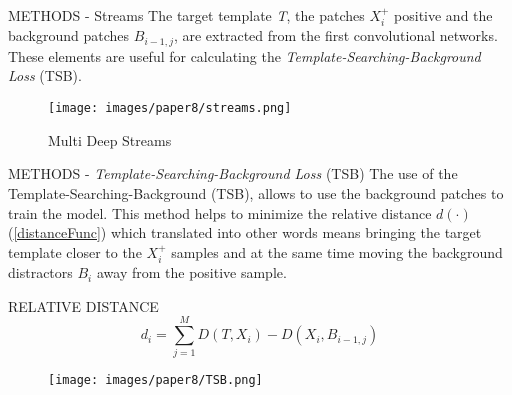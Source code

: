 \begin{frame}{METHODS - Streams}
    The target template \emph{T}, the patches $X_i^+$ positive and the background patches $B_{i-1,j}$, are extracted from the first convolutional networks. These elements are useful for calculating the \emph{Template-Searching-Background Loss} (TSB).
    \begin{figure}[h!]
        \centering
        \texttt{[image: images/paper8/streams.png]}
        \centering
        \caption{Multi Deep Streams}
        \label{fig:streams}
    \end{figure}
\end{frame}

\begin{frame}{METHODS - \emph{Template-Searching-Background Loss} (TSB)}
    The use of the Template-Searching-Background (TSB), allows to use the 
    background patches to train the model. This method helps to minimize 
    the relative distance $d(\cdot)$ (\ref{distanceFunc}) which translated into other words means 
    bringing the target template closer to the $X_i^+$ samples and at the same 
    time moving the background distractors $B_i$ away from the positive 
    sample.
    \begin{minipage}{\linewidth}
        \centering
        \begin{minipage}{0.45\linewidth}
            \begin{block}{RELATIVE DISTANCE}
                \begin{equation}\label{distanceFunc}
                    d_i=\sum^M_{j=1} D(T, X_i) - D(X_i, B_{i-1,j})
                \end{equation}
            \end{block}  
        \end{minipage}
        \hspace{0.05\linewidth}
        \begin{minipage}{0.47\linewidth}
            \begin{figure}[h!]
                \centering
                \texttt{[image: images/paper8/TSB.png]}
                \centering
            \end{figure}
        \end{minipage}
    \end{minipage}
\end{frame}

